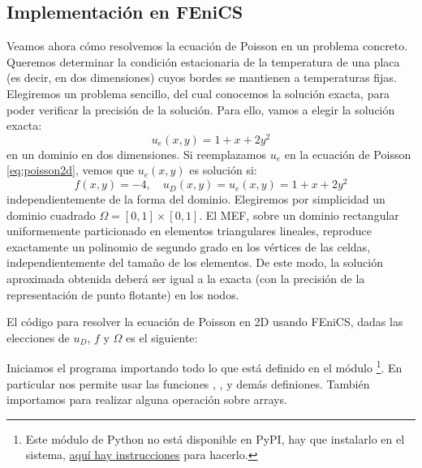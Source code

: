 \subsection{Implementación en FEniCS}
Veamos ahora cómo resolvemos la ecuación de Poisson en un problema concreto. Queremos determinar la condición estacionaria de la temperatura de una placa (es decir, en dos dimensiones) cuyos bordes se mantienen a temperaturas fijas. Elegiremos un problema sencillo, del cual conocemos la solución exacta, para poder verificar la precisión de la solución. Para ello, vamos a elegir la solución exacta:
\begin{equation}\label{eq:femex}
 u_e(x,y) = 1 + x + 2 y^2
\end{equation} 
en un dominio en dos dimensiones. Si reemplazamos $u_e$ en la ecuación de Poisson \eqref{eq:poisson2d}, vemos que $u_e(x,y)$ es solución si:
\begin{equation}
 f(x, y) = -4, \quad u_D(x, y) = u_e(x, y) = 1 + x + 2 y^2
\end{equation} 
independientemente de la forma del dominio. Elegiremos por simplicidad un dominio cuadrado $\Omega = [0, 1] \times [0, 1]$. El MEF, sobre un dominio rectangular uniformemente particionado en elementos triangulares lineales, reproduce exactamente un polinomio de segundo grado en los vértices de las celdas, independientemente del tamaño de los elementos. De este modo, la solución aproximada obtenida deberá ser igual a la exacta (con la precisión de la representación de punto flotante) en los nodos.

El código para resolver la ecuación de Poisson en 2D usando FEniCS, dadas las elecciones de $u_D$, $f$ y $\Omega$ es el siguiente:


Iniciamos el programa importando todo lo que está definido en el módulo \footnote{Este módulo de Python no está disponible en PyPI, hay que instalarlo en el sistema, \href{https://fenics.readthedocs.io/en/latest/installation.html}{aquí hay instrucciones} para hacerlo.}. En particular nos permite usar las funciones , ,  y demás definiones. También importamos  para realizar alguna operación sobre arrays.

